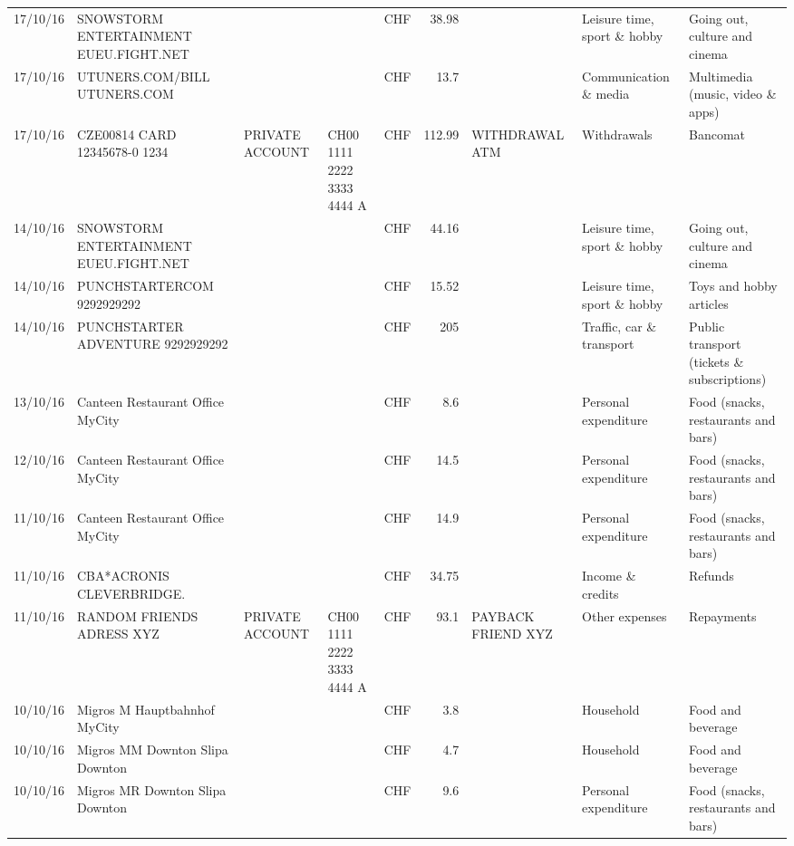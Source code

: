 \begin{landscape}
\begin{table}[h]
\begin{center}
\begin{tabular}{rllllrlll}
		17/10/16 & SNOWSTORM ENTERTAINMENT EUEU.FIGHT.NET &       &       & CHF   & 38.98 &       & Leisure time, sport \& hobby & Going out, culture and cinema \\
		17/10/16 & UTUNERS.COM/BILL          UTUNERS.COM &       &       & CHF   & 13.7  &       & Communication \& media & Multimedia (music, video \& apps) \\
		17/10/16 & CZE00814 CARD 12345678-0 1234 & PRIVATE ACCOUNT & CH00 1111 2222 3333 4444 A & CHF   & 112.99 & WITHDRAWAL ATM & Withdrawals & Bancomat \\
		14/10/16 & SNOWSTORM ENTERTAINMENT EUEU.FIGHT.NET &       &       & CHF   & 44.16 &       & Leisure time, sport \& hobby & Going out, culture and cinema \\
		14/10/16 & PUNCHSTARTERCOM           9292929292 &       &       & CHF   & 15.52 &       & Leisure time, sport \& hobby & Toys and hobby articles \\
		14/10/16 & PUNCHSTARTER ADVENTURE    9292929292 &       &       & CHF   & 205   &       & Traffic, car \& transport & Public transport (tickets \& subscriptions) \\
		13/10/16 & Canteen Restaurant Office      MyCity &       &       & CHF   & 8.6   &       & Personal expenditure & Food (snacks, restaurants and bars) \\
		12/10/16 & Canteen Restaurant Office      MyCity &       &       & CHF   & 14.5  &       & Personal expenditure & Food (snacks, restaurants and bars) \\
		11/10/16 & Canteen Restaurant Office      MyCity &       &       & CHF   & 14.9  &       & Personal expenditure & Food (snacks, restaurants and bars) \\
		11/10/16 & CBA*ACRONIS              CLEVERBRIDGE. &       &       & CHF   & 34.75 &       & Income \& credits & Refunds \\
		11/10/16 & RANDOM FRIENDS ADRESS XYZ & PRIVATE ACCOUNT & CH00 1111 2222 3333 4444 A & CHF   & 93.1  & PAYBACK FRIEND XYZ & Other expenses & Repayments \\
		10/10/16 & Migros M Hauptbahnhof    MyCity &       &       & CHF   & 3.8   &       & Household & Food and beverage \\
		10/10/16 & Migros MM Downton Slipa   Downton &       &       & CHF   & 4.7   &       & Household & Food and beverage \\
		10/10/16 & Migros MR Downton Slipa   Downton &       &       & CHF   & 9.6   &       & Personal expenditure & Food (snacks, restaurants and bars) \\

\end{tabular}
\end{center}
\end{table}
\end{landscape}
